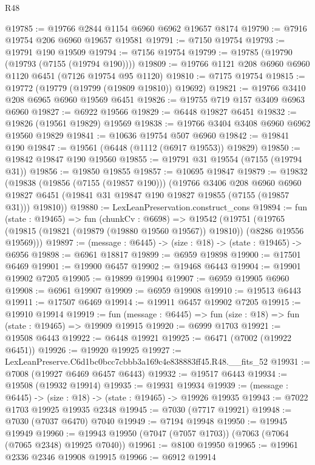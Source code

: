 \begin{lexlean}{R48}
\begin{coremodule}
@19785 := @19766 @2844 @1154 @6960 @6962 @19657 @8174
@19790 := @7916 @19754 @206 @6960 @19657 @19581
@19791 := @7150 @19754
@19793 := @19791 @190 @19509
@19794 := @7156 @19754
@19799 := @19785 (@19790 (@19793 (@7155 (@19794 @190))))
@19809 := @19766 @1121 @208 @6960 @6960 @1120 @6451 (@7126 @19754 @95 @1120)
@19810 := @7175 @19754
@19815 := @19772 (@19779 (@19799 (@19809 @19810)) @19692)
@19821 := @19766 @3410 @208 @6965 @6960 @19569 @6451
@19826 := @19755 @719 @157 @3409 @6963 @6960
@19827 := @6922 @19566
@19829 := @6448 @19827 @6451
@19832 := @19826 (@19561 @19829) @19569
@19838 := @19766 @3404 @3408 @6960 @6962 @19560 @19829
@19841 := @10636 @19754 @507 @6960
@19842 := @19841 @190
@19847 := @19561 (@6448 (@1112 (@6917 @19553)) @19829)
@19850 := @19842 @19847 @190 @19560
@19855 := @19791 @31 @19554 (@7155 (@19794 @31))
@19856 := @19850 @19855
@19857 := @10695 @19847
@19879 := @19832
    (@19838
      (@19856 (@7155 (@19857 @190)))
      (@19766
        @3406
        @208
        @6960
        @6960
        @19827
        @6451
        (@19841 @31 @19847 @190 @19827 @19855 (@7155 (@19857 @31)))
        @19810))
@19880 := LexLeanPreservation.construct_cons
@19894 := fun (state : @19465) =>
  fun (chunkCv : @6698) =>
  @19542
    (@19751 (@19765 (@19815 (@19821 (@19879 (@19880 @19560 @19567)) @19810)) (@8286 @19556 @19569)))
@19897 := (message : @6445) -> (size : @18) -> (state : @19465) -> @6956
@19898 := @6961 @18817
@19899 := @6959 @19898
@19900 := @17501 @6469
@19901 := @19900 @6457
@19902 := @19468 @6443
@19904 := @19901 @19902 @7205
@19905 := @19899 @19904
@19907 := @6959 @19905 @6960
@19908 := @6961 @19907
@19909 := @6959 @19908
@19910 := @19513 @6443
@19911 := @17507 @6469
@19914 := @19911 @6457 @19902 @7205
@19915 := @19910 @19914
@19919 := fun (message : @6445) => fun (size : @18) => fun (state : @19465) => @19909 @19915
@19920 := @6999 @1703
@19921 := @19508 @6443
@19922 := @6448 @19921
@19925 := @6471 (@7002 (@19922 @6451))
@19926 := @19920 @19925
@19927 := LexLeanPreserve.C6d1bc0bcc7cbbb3a169c4e838883ff45.R48.__fits_52
@19931 := @7008 (@19927 @6469 @6457 @6443)
@19932 := @19517 @6443
@19934 := @19508 (@19932 @19914)
@19935 := @19931 @19934
@19939 := (message : @6445) -> (size : @18) -> (state : @19465) -> @19926 @19935
@19943 := @7022 @1703 @19925 @19935 @2348
@19945 := @7030 (@7717 @19921)
@19948 := @7030 (@7037 @6470) @7040
@19949 := @7194 @19948
@19950 := @19945 @19949
@19960 := @19943 @19950 (@7047 (@7057 @1703)) (@7063 (@7064 (@7065 @2348) @19925 @7040))
@19961 := @8100 @19950
@19965 := @19961 @2336 @2346 @19908 @19915
@19966 := @6912 @19914

\end{coremodule}
\end{lexlean}

